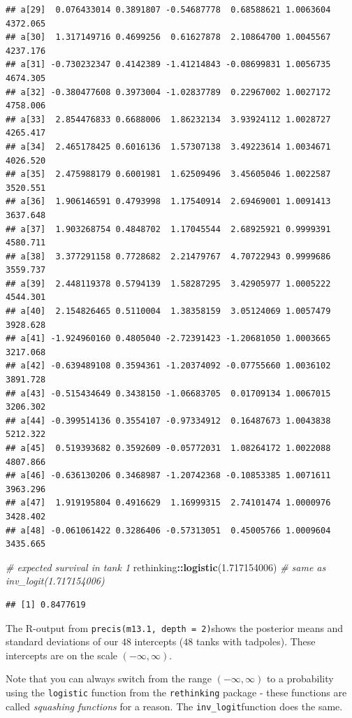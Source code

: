 \documentclass[
]{book}
\newenvironment{Shaded}{\begin{snugshade}}{\end{snugshade}}
\newcommand{\CommentTok}[1]{\textcolor[rgb]{0.56,0.35,0.01}{\textit{#1}}}
\newcommand{\FloatTok}[1]{\textcolor[rgb]{0.00,0.00,0.81}{#1}}
\newcommand{\FunctionTok}[1]{\textcolor[rgb]{0.13,0.29,0.53}{\textbf{#1}}}
\newcommand{\NormalTok}[1]{#1}
\newcommand{\SpecialCharTok}[1]{\textcolor[rgb]{0.81,0.36,0.00}{\textbf{#1}}}
\begin{document}
\begin{verbatim}
## a[29]  0.076433014 0.3891807 -0.54687778  0.68588621 1.0063604 4372.065
## a[30]  1.317149716 0.4699256  0.61627878  2.10864700 1.0045567 4237.176
## a[31] -0.730232347 0.4142389 -1.41214843 -0.08699831 1.0056735 4674.305
## a[32] -0.380477608 0.3973004 -1.02837789  0.22967002 1.0027172 4758.006
## a[33]  2.854476833 0.6688006  1.86232134  3.93924112 1.0028727 4265.417
## a[34]  2.465178425 0.6016136  1.57307138  3.49223614 1.0034671 4026.520
## a[35]  2.475988179 0.6001981  1.62509496  3.45605046 1.0022587 3520.551
## a[36]  1.906146591 0.4793998  1.17540914  2.69469001 1.0091413 3637.648
## a[37]  1.903268754 0.4848702  1.17045544  2.68925921 0.9999391 4580.711
## a[38]  3.377291158 0.7728682  2.21479767  4.70722943 0.9999686 3559.737
## a[39]  2.448119378 0.5794139  1.58287295  3.42905977 1.0005222 4544.301
## a[40]  2.154826465 0.5110004  1.38358159  3.05124069 1.0057479 3928.628
## a[41] -1.924960160 0.4805040 -2.72391423 -1.20681050 1.0003665 3217.068
## a[42] -0.639489108 0.3594361 -1.20374092 -0.07755660 1.0036102 3891.728
## a[43] -0.515434649 0.3438150 -1.06683705  0.01709134 1.0067015 3206.302
## a[44] -0.399514136 0.3554107 -0.97334912  0.16487673 1.0043838 5212.322
## a[45]  0.519393682 0.3592609 -0.05772031  1.08264172 1.0022088 4807.866
## a[46] -0.636130206 0.3468987 -1.20742368 -0.10853385 1.0071611 3963.296
## a[47]  1.919195804 0.4916629  1.16999315  2.74101474 1.0000976 3428.402
## a[48] -0.061061422 0.3286406 -0.57313051  0.45005766 1.0009604 3435.665
\end{verbatim}

\begin{Shaded}
\begin{Highlighting}[]
\CommentTok{\# expected survival in tank 1}
\NormalTok{rethinking}\SpecialCharTok{::}\FunctionTok{logistic}\NormalTok{(}\FloatTok{1.717154006}\NormalTok{) }\CommentTok{\# same as inv\_logit(1.717154006)}
\end{Highlighting}
\end{Shaded}

\begin{verbatim}
## [1] 0.8477619
\end{verbatim}

The R-output from \texttt{precis(m13.1,\ depth\ =\ 2)}shows the posterior means and standard deviations of
our \(48\) intercepts (\(48\) tanks with tadpoles). These intercepts are on the scale \((-\infty, \infty)\).

Note that you can always switch from the range \((-\infty, \infty)\) to a probability using the \texttt{logistic} function
from the \texttt{rethinking} package - these functions are called \emph{squashing functions} for a reason.
The \texttt{inv\_logit}function does the same.
\end{document}
